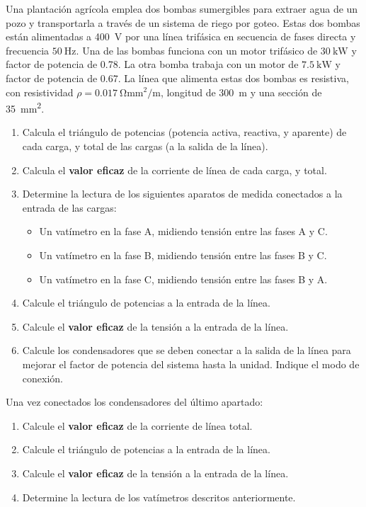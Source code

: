  Una plantación agrícola emplea dos bombas sumergibles para extraer
 agua de un pozo y transportarla a través de un sistema de riego por
 goteo. Estas dos bombas están alimentadas a \SI{400}{\volt} por una
 línea trifásica en secuencia de fases directa y frecuencia
 $\SI{50}{\hertz}$. Una de las bombas funciona con un motor trifásico
 de $\SI{30}{\kilo\watt}$ y factor de potencia de 0.78. La otra bomba
 trabaja con un motor de $\SI{7.5}{\kilo\watt}$ y factor de potencia
 de 0.67.  La línea que alimenta estas dos bombas es resistiva, con
 resistividad $\rho = \SI{0.017}{\ohm\milli\meter\squared\per\meter}$,
 longitud de \SI{300}{m} y una sección de
 \SI{35}{\milli\meter\squared}.
 
 \begin{enumerate}
 \item Calcula el triángulo de potencias (potencia activa, reactiva, y
   aparente) de cada carga, y total de las cargas (a la salida de la
   línea).
 \item Calcula el \textbf{valor eficaz} de la corriente de línea de
   cada carga, y total.
 \item Determine la lectura de los siguientes aparatos de medida
   conectados a la entrada de las cargas:
   \begin{itemize}
   \item Un vatímetro en la fase A, midiendo tensión entre las fases A
     y C.
   \item Un vatímetro en la fase B, midiendo tensión entre las fases B
     y C.
   \item Un vatímetro en la fase C, midiendo tensión entre las fases B
     y A.
   \end{itemize}
 \item Calcule el triángulo de potencias a la entrada de la línea.
 \item Calcule el \textbf{valor eficaz} de la tensión a la entrada de la línea.
 \item Calcule los condensadores que se deben conectar a la salida de
   la línea para mejorar el factor de potencia del sistema hasta la
   unidad. Indique el modo de conexión.
 \end{enumerate}

Una vez conectados los condensadores del último apartado:
\begin{enumerate}[resume]
\item Calcule el \textbf{valor eficaz} de la corriente de línea total.
\item Calcule el triángulo de potencias a la entrada de la línea.
\item Calcule el \textbf{valor eficaz} de la tensión a la entrada de la línea.
\item Determine la lectura de los vatímetros descritos anteriormente.
\end{enumerate}

